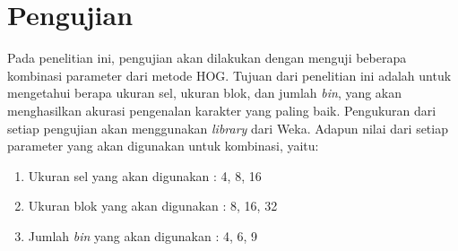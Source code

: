 
\section{Pengujian}
\noindent Pada penelitian ini, pengujian akan dilakukan dengan menguji beberapa kombinasi parameter dari metode HOG. Tujuan dari penelitian ini adalah untuk mengetahui berapa ukuran sel, ukuran blok, dan jumlah \textit{bin}, yang akan menghasilkan akurasi pengenalan karakter yang paling baik. Pengukuran dari setiap pengujian akan menggunakan \textit{library} dari Weka. Adapun nilai dari setiap parameter yang akan digunakan untuk kombinasi, yaitu:
\begin{enumerate}
\item Ukuran sel yang akan digunakan : 4, 8, 16
\item Ukuran blok yang akan digunakan : 8, 16, 32
\item Jumlah \textit{bin} yang akan digunakan : 4, 6, 9
\end{enumerate}

